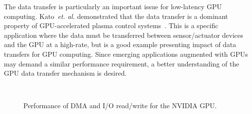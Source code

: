 The data transfer is particularly an important issue for low-latency GPU
computing.
Kato~\textit{et. al.} demonstrated that the data transfer is a dominant
property of GPU-accelerated plasma control systems~\cite{Kato_ICCPS13}.
This is a specific application where the data must be transferred
between sensor/actuator devices and the GPU at a high-rate, but is a
good example presenting impact of data transfers for GPU computing.
Since emerging applications augmented with GPUs may demand a similar
performance requirement, a better understanding of the GPU data transfer
mechanism is desired.

\begin{figure}[!t]
 \centering
 \\
 \caption{Performance of DMA and I/O read/write for the NVIDIA GPU.}
 \label{fig:intro_data_transfer}
\end{figure}

